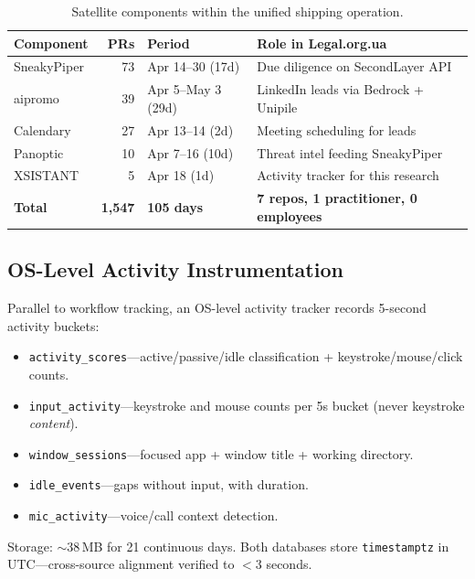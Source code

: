 \documentclass[11pt]{article}
\begin{document}
\begin{table}[h]
\centering
\caption{Satellite components within the unified shipping operation.}
\label{tab:satellites}
\begin{tabular}{@{}lrlp{5.5cm}@{}}
\toprule
\textbf{Component} & \textbf{PRs} & \textbf{Period} & \textbf{Role in Legal.org.ua} \\
\midrule
SneakyPiper & 73  & Apr 14--30 (17d) & Due diligence on SecondLayer API \\
aipromo     & 39  & Apr 5--May 3 (29d)  & LinkedIn leads via Bedrock + Unipile \\
Calendary   & 27  & Apr 13--14 (2d)     & Meeting scheduling for leads \\
Panoptic    & 10  & Apr 7--16 (10d)     & Threat intel feeding SneakyPiper \\
XSISTANT    & 5   & Apr 18 (1d)         & Activity tracker for this research \\
\midrule
\textbf{Total} & \textbf{1{,}547} & \textbf{105 days} & \textbf{7 repos, 1 practitioner, 0 employees} \\
\bottomrule
\end{tabular}
\end{table}

\subsection{OS-Level Activity Instrumentation}
\label{sec:os-instrumentation}

Parallel to workflow tracking, an OS-level activity tracker records 5-second activity buckets:

\begin{itemize}[nosep]
  \item \texttt{activity\_scores}---active/passive/idle classification + keystroke/mouse/click counts.
  \item \texttt{input\_activity}---keystroke and mouse counts per 5s bucket (never keystroke \emph{content}).
  \item \texttt{window\_sessions}---focused app + window title + working directory.
  \item \texttt{idle\_events}---gaps without input, with duration.
  \item \texttt{mic\_activity}---voice/call context detection.
\end{itemize}

\noindent Storage: $\sim$38\,MB for 21 continuous days.
Both databases store \texttt{timestamptz} in UTC---cross-source alignment verified to $<$3 seconds.
\end{document}

